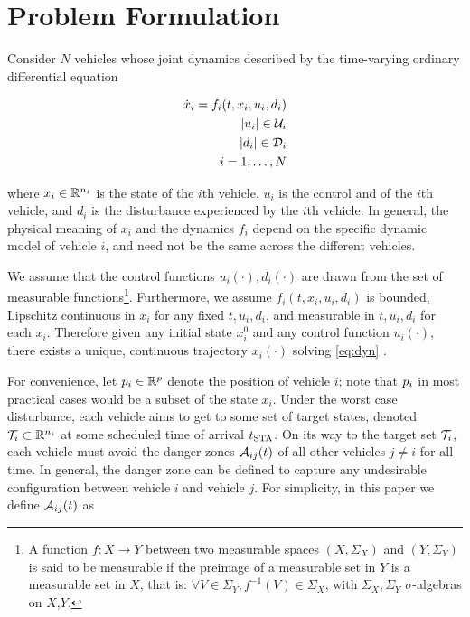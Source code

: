 \section{Problem Formulation \label{sec:formulation}}
Consider $N$ vehicles whose joint dynamics described by the time-varying ordinary differential equation

\begin{equation}
\label{eq:dyn}
\begin{aligned}
\dot{x}_i = f_i(t, x_i, u_i, d_i) \\
|u_i| \in \mathcal{U}_i \\
|d_i| \in \mathcal{D}_i \\
i = 1,\ldots, N
\end{aligned}
\end{equation}

where $x_i \in \mathbb{R}^{n_i}$ is the state of the $i$th vehicle, $u_i$ is the control and of the $i$th vehicle, and $d_i$ is the disturbance experienced by the $i$th vehicle. In general, the physical meaning of $x_i$ and the dynamics $f_i$ depend on the specific dynamic model of vehicle $i$, and need not be the same across the different vehicles. 

We assume that the control functions $u_i(\cdot), d_i(\cdot)$ are drawn from the set of measurable functions\footnote{
A function $f:X\to Y$ between two measurable spaces $(X,\Sigma_X)$ and $(Y,\Sigma_Y)$ is said to be measurable if the preimage of a measurable set in $Y$ is a measurable set in $X$, that is: $\forall V\in\Sigma_Y, f^{-1}(V)\in\Sigma_X$, with $\Sigma_X,\Sigma_Y$ $\sigma$-algebras on $X$,$Y$.}. Furthermore, we assume $f_i(t,x_i, u_i, d_i)$ is bounded, Lipschitz continuous in $x_i$ for any fixed $t, u_i, d_i$, and measurable in $t, u_i, d_i$ for each $x_i$. Therefore given any initial state $x_i^0$ and any control function $u_i(\cdot)$, there exists a unique, continuous trajectory $x_i(\cdot)$ solving \eqref{eq:dyn} \cite{Coddington55}.

For convenience, let $p_i \in \mathbb{R}^p$ denote the position of vehicle $i$; note that $p_i$ in most practical cases would be a subset of the state $x_i$. Under the worst case disturbance, each vehicle aims to get to some set of target states, denoted $\mathcal{T}_i \subset \mathbb{R}^{n_i}$ at some scheduled time of arrival $t_\text{STA}$. On its way to the target set $\mathcal{T}_i$, each vehicle must avoid the danger zones $\mathcal{A}_{ij}(t)$ of all other vehicles $j\neq i$ for all time. In general, the danger zone can be defined to capture any undesirable configuration between vehicle $i$ and vehicle $j$. For simplicity, in this paper we define $\mathcal{A}_{ij}(t)$ as

